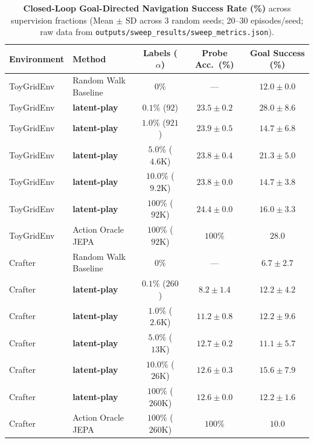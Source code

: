 \documentclass[11pt,letterpaper]{article}
\begin{document}
\begin{table}[ht]
\centering
\caption{\textbf{Closed-Loop Goal-Directed Navigation Success Rate (\%)} across supervision fractions (Mean $\pm$ SD across 3 random seeds; 20--30 episodes/seed; raw data from \texttt{outputs/sweep\_results/sweep\_metrics.json}).}
\label{tab:planning}
\vspace{0.4em}
\small
\setlength{\tabcolsep}{7pt}
\begin{tabular}{llccc}
\toprule
\textbf{Environment} & \textbf{Method} & \textbf{Labels ($\alpha$)} & \textbf{Probe Acc.\ (\%)} & \textbf{Goal Success (\%)} \\
\midrule
ToyGridEnv & Random Walk Baseline & $0\%$ & --- & $12.0 \pm 0.0$ \\
ToyGridEnv & \textbf{latent-play} & $0.1\%$ ($92$) & $23.5 \pm 0.2$ & $\mathbf{28.0 \pm 8.6}$ \\
ToyGridEnv & \textbf{latent-play} & $1.0\%$ ($921$) & $23.9 \pm 0.5$ & $14.7 \pm 6.8$ \\
ToyGridEnv & \textbf{latent-play} & $5.0\%$ ($4.6\text{K}$) & $23.8 \pm 0.4$ & $21.3 \pm 5.0$ \\
ToyGridEnv & \textbf{latent-play} & $10.0\%$ ($9.2\text{K}$) & $23.8 \pm 0.0$ & $14.7 \pm 3.8$ \\
ToyGridEnv & \textbf{latent-play} & $100\%$ ($92\text{K}$) & $24.4 \pm 0.0$ & $16.0 \pm 3.3$ \\
ToyGridEnv & Action Oracle JEPA & $100\%$ ($92\text{K}$) & $100\%$ & $28.0$ \\
\midrule
Crafter & Random Walk Baseline & $0\%$ & --- & $6.7 \pm 2.7$ \\
Crafter & \textbf{latent-play} & $0.1\%$ ($260$) & $8.2 \pm 1.4$ & $12.2 \pm 4.2$ \\
Crafter & \textbf{latent-play} & $1.0\%$ ($2.6\text{K}$) & $11.2 \pm 0.8$ & $\mathbf{12.2 \pm 9.6}$ \\
Crafter & \textbf{latent-play} & $5.0\%$ ($13\text{K}$) & $12.7 \pm 0.2$ & $11.1 \pm 5.7$ \\
Crafter & \textbf{latent-play} & $10.0\%$ ($26\text{K}$) & $12.6 \pm 0.3$ & $\mathbf{15.6 \pm 7.9}$ \\
Crafter & \textbf{latent-play} & $100\%$ ($260\text{K}$) & $12.6 \pm 0.0$ & $12.2 \pm 1.6$ \\
Crafter & Action Oracle JEPA & $100\%$ ($260\text{K}$) & $100\%$ & $10.0$ \\
\bottomrule
\end{tabular}
\end{table}
\end{document}

